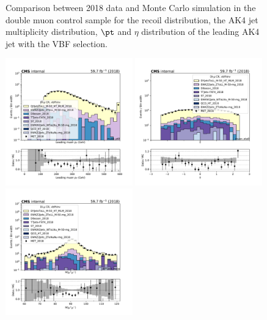 {\begin{figure}[htbp]
\begin{center}
    \end{center}
    \caption{Comparison between 2018 data and Monte Carlo simulation in the double muon control sample for
        the recoil distribution, the AK4 jet multiplicity distribution,  $\pt$ and $\eta$ distribution
        of the leading AK4 jet with the VBF selection.}
    \label{fig:DM_vbfhinv_2018}
\end{figure}

\begin{figure}[htbp]
    \begin{center}
        \includegraphics[width=0.49\textwidth]{fig/datamc/cr_2m_vbf/cr_2m_vbf_muon_pt0_losf_2018.pdf}
        \includegraphics[width=0.49\textwidth]{fig/datamc/cr_2m_vbf/cr_2m_vbf_muon_eta0_losf_2018.pdf} \\
        \includegraphics[width=0.49\textwidth]{fig/datamc/cr_2m_vbf/cr_2m_vbf_dimuon_mass_losf_2018.pdf}

\end{center}
\end{figure}}
